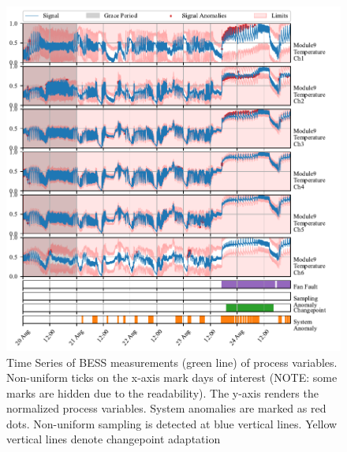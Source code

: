 \begin{figure}[htbp]
 \centerline{\includegraphics{figures/Kokam_thresh.pdf}}
 \caption{Time Series of BESS measurements (green line) of process variables. Non-uniform ticks on the x-axis mark days of interest (NOTE: some marks are hidden due to the readability). The y-axis renders the normalized process variables. System anomalies are marked as red dots. Non-uniform sampling is detected at blue vertical lines. Yellow vertical lines denote changepoint adaptation}
 \label{fig:kokam}
\end{figure}
